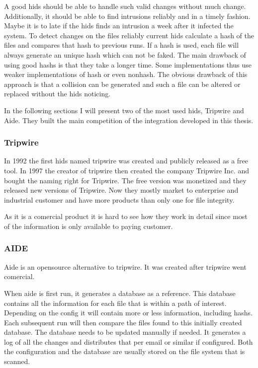 \documentclass[
	a4paper,					%
	10pt,							%
	twoside,					%
	openright,				%
	notitlepage,			%
	parskip=half,			%
]{scrreprt}					%
\begin{document}
A good \gls{hids} should be able to handle such valid changes without much change. Additionally, it should be able to find intrusions reliably and in a timely fashion. Maybe it is to late if the \gls{hids} finds an intrusion a week after it infected the system. To detect changes on the files reliably current \gls{hids} calculate a hash of the files and compares that hash to previous runs. If a \gls{hash} is used, each file will always generate an unique hash which can not be faked. The main drawback of using good \glspl{hash} is that they take a longer time. Some implementations thus use weaker implementations of \gls{hash} or even \gls{nonhash}. The obvious drawback of this approach is that a collision can be generated and such a file can be altered or replaced without the \gls{hids} noticing. 

In the following sections I will present two of the most used \gls{hids}, Tripwire and Aide. They built the main competition of the integration developed in this thesis.

\subsubsection{Tripwire}
\label{sec:tripwire}

In 1992 the first \gls{hids} named tripwire was created and publicly released as a free tool. In 1997 the creator of tripwire then created the company Tripwire Inc. and bought the naming right for Tripwire. The free version was monetized and they released new versions of Tripwire. \cite{Tripwire:Impl,Tripwire:company} Now they mostly market to enterprise and industrial customer and have more products than only one for file integrity. \cite{tripwire}

As it is a comercial product it is hard to see how they work in detail since most of the information is only available to paying customer. 

\subsubsection{AIDE}
\label{sec:aide}

Aide is an \gls{opensource} alternative to tripwire. It was created after tripwire went comercial. \cite{aide:totherescue, aide:github}

When aide is first run, it generates a database as a reference. This database contains all the information for each file that is within a path of interest. Depending on the config it will contain more or less information, including \glspl{hash}. Each subsequent run will then compare the files found to this initially created database. The database needs to be updated manually if needed. It generates a log of all the changes and distributes that per email or similar if configured. Both the configuration and the database are usually stored on the file system that is scanned. \cite{aide, aide:doc}
\end{document}
